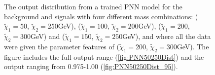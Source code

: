 \begin{figure}
    \caption[The output distribution from a trained \acs{PNN} model for the background and signals with four different mass combinations, where 
    all events are given the same parameter.]{
    The output distribution from a trained \ac{PNN} model for the background and signals with four different mass combinations:
    ($\tilde{\chi}_1=50$, $\tilde{\chi}_2=250$GeV), ($\tilde{\chi}_1=100$, $\tilde{\chi}_2=200$GeV), 
    ($\tilde{\chi}_1=200$, $\tilde{\chi}_2=300$GeV) and ($\tilde{\chi}_1=150$, $\tilde{\chi}_2=250$GeV), and where all the data were given the 
    parameter features of ($\tilde{\chi}_1=200$, $\tilde{\chi}_2=300$GeV). The figure includes the full output range (\ref{fig:PNN50250Dist}) 
    and the output ranging from 0.975-1.00 (\ref{fig:PNN50250Dist_95}).}
    \label{fig:PNN200300DistComp}
\end{figure}
